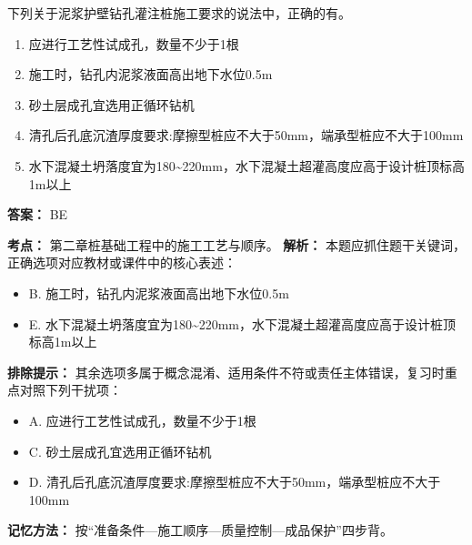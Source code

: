 \documentclass[UTF8,fontset=fandol,11pt]{ctexart}
\begin{document}
\begin{quizbox}[title={第 3 题}]
下列关于泥浆护壁钻孔灌注桩施工要求的说法中，正确的有。\\
\begin{enumerate}[label=\Alph*.]
\item 应进行工艺性试成孔，数量不少于1根
\item 施工时，钻孔内泥浆液面高出地下水位0.5m
\item 砂土层成孔宜选用正循环钻机
\item 清孔后孔底沉渣厚度要求:摩擦型桩应不大于50mm，端承型桩应不大于100mm
\item 水下混凝土坍落度宜为180\textasciitilde{}220mm，水下混凝土超灌高度应高于设计桩顶标高1m以上
\end{enumerate}
\textbf{答案：} BE
\vspace{0.25em}
\begin{answerbox}[title={考点解析}]
\textbf{考点：} 第二章桩基础工程中的施工工艺与顺序。
\textbf{解析：} 本题应抓住题干关键词，正确选项对应教材或课件中的核心表述：
\begin{itemize}
\item B. 施工时，钻孔内泥浆液面高出地下水位0.5m
\item E. 水下混凝土坍落度宜为180\textasciitilde{}220mm，水下混凝土超灌高度应高于设计桩顶标高1m以上
\end{itemize}
\textbf{排除提示：} 其余选项多属于概念混淆、适用条件不符或责任主体错误，复习时重点对照下列干扰项：
\begin{itemize}
\item A. 应进行工艺性试成孔，数量不少于1根
\item C. 砂土层成孔宜选用正循环钻机
\item D. 清孔后孔底沉渣厚度要求:摩擦型桩应不大于50mm，端承型桩应不大于100mm
\end{itemize}
\textbf{记忆方法：} 按“准备条件—施工顺序—质量控制—成品保护”四步背。
\end{answerbox}
\end{quizbox}

\vspace{0.2em}
\end{document}
